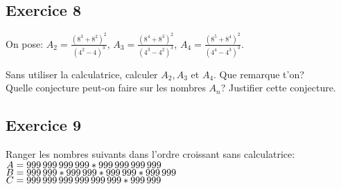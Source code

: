 \documentclass[12pt, twoside]{article}
\begin{document}
\section*{}

\subsection*{Exercice 8}

On pose: $A_2=\frac{(8^{3}+8^{2})^{2}}{(4^{2}-4)^{3}}$, \enskip
$A_3=\frac{(8^{4}+8^{3})^{2}}{(4^{3}-4^{2})^{3}}$, \enskip
$A_4=\frac{(8^{5}+8^{4})^{2}}{(4^{4}-4^{3})^{3}}$.


Sans utiliser la calculatrice, calculer $A_2,A_3$ et $A_4$. Que remarque t'on?\\
Quelle conjecture peut-on faire sur les nombres $A_n$? Justifier cette
conjecture.

\subsection*{Exercice 9}
Ranger les nombres suivants dans l'ordre croissant sans calculatrice:\\
$A=999 \thinspace 999 \thinspace 999 \thinspace 999 * 999 \thinspace 999
\thinspace 999 \thinspace 999$\\
$B= 999 \thinspace 999* 999 \thinspace 999 *999 \thinspace 999 * 999 \thinspace
999$\\
$C=999 \thinspace 999 \thinspace 999 \thinspace 999 \thinspace 999 \thinspace
999 * 999 \thinspace 999$
\end{document}
